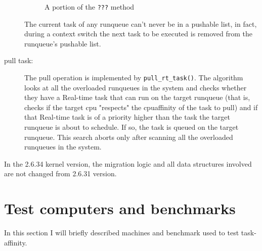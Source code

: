 \begin{description}
\begin{figure}[h]
  \lstset{basicstyle=\footnotesize, language=c, captionpos=b, frame=single, label=lis:steps}
  
  \label{code:ttwu}
  \caption{A portion of the \texttt{???} method}
\end{figure}

The current task of any runqueue can't never be in a pushable list, in fact, during a context switch the next task to be executed is removed from the 
runqueue's pushable list.

\item[pull task:] The pull operation is implemented by \texttt{pull\_rt\_task()}. The algorithm looks at all the overloaded runqueues in the system 
and checks whether they have a Real-time task that can run on the target runqueue (that is, checks if the target cpu "respects" the cpuaffinity of the 
task to pull) and if that Real-time task is of a priority higher than the task the target runqueue is about to schedule. If so, the task is queued on 
the target runqueue. This search aborts only after scanning all the overloaded runqueues in the system. 

\end{description}

In the 2.6.34 kernel version, the migration logic and all data structures involved are not changed from 2.6.31 version.

\section{Test computers and benchmarks}

In this section I will briefly described machines and benchmark used to test task-affinity.

